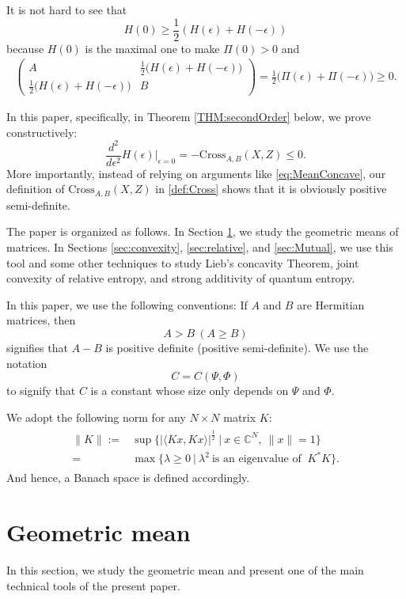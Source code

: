 \documentclass{article}
\numberwithin{equation}{section}
\begin{document}
It is not hard to see that 
\begin{equation}\label{eq:MeanConcave}
 H(0)\geq \frac{1}{2}(H(\epsilon)+H(-\epsilon))
\end{equation}
because $H(0)$ is the maximal one to make $\Pi(0)>0$ and
\begin{align*}
\begin{pmatrix}
A & \frac{1}{2} \big(H(\epsilon)+H(-\epsilon)\big) \\
\frac{1}{2} \big(H(\epsilon)+H(-\epsilon)\big) & B
\end{pmatrix}
=\frac{1}{2}\big(\Pi(\epsilon)+\Pi(-\epsilon)\big)\geq 0.
\end{align*}

In this paper, specifically, in Theorem \ref{THM:secondOrder} below, we prove constructively: $$\frac{d^2}{d\epsilon^2} H(\epsilon)|_{\epsilon=0}=-\text{Cross}_{A,B}(X,Z)\leq 0.$$ More importantly, instead of relying on arguments like \eqref{eq:MeanConcave}, our definition of $\text{Cross}_{A,B}(X,Z)$ in \eqref{def:Cross} shows that it is obviously positive semi-definite.

The paper is organized as follows. In Section \ref{sec:tool}, we study the geometric means of matrices. In Sections \ref{sec:convexity}, \ref{sec:relative}, and \ref{sec:Mutual}, we use this tool and some other techniques to study Lieb's concavity Theorem, joint convexity of relative entropy, and strong additivity of quantum entropy.

In this paper, we use the following conventions: If $A$ and $B$ are Hermitian matrices, then $$A>B\ (A\geq B)$$ signifies that $A-B$ is positive definite (positive semi-definite). We use the notation $$C=C(\Psi,\Phi)$$ to signify that $C$ is a constant whose size only depends on $\Psi$ and $\Phi$.

We adopt the following norm for any $N\times N$ matrix $K$:
\begin{align}\label{def:Norm}
\begin{split}
  \|K\|:=&\sup\big\{ |\langle K x, Kx\rangle|^{\frac{1}{2}} \ \big|\ x\in \mathbb{C}^N,\ \|x\|=1\big\}\\
  =&\max\big\{ \lambda\geq 0\ \big| \ \lambda^2\ \text{is an eigenvalue of }\ K^* K\big\}.
\end{split}
\end{align} And hence, a Banach space is defined accordingly.

    
\section{Geometric mean}\label{sec:tool}
In this section, we study the geometric mean and present one of the main technical tools of the present paper.
\end{document}
